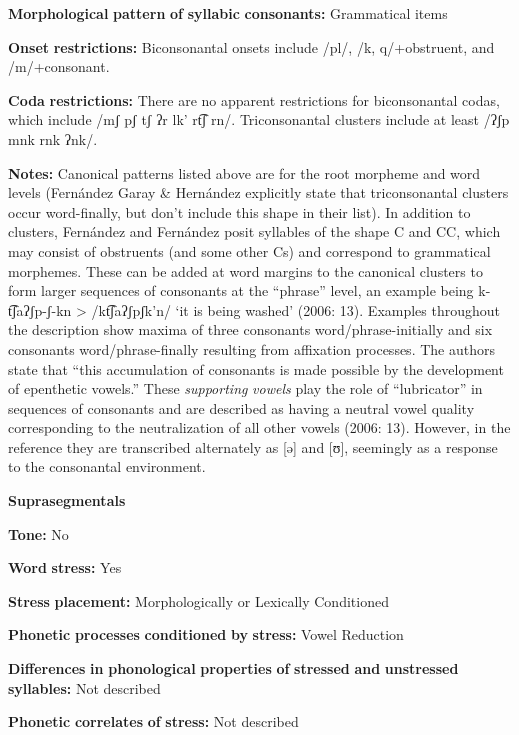 \textbf{Morphological} \textbf{pattern} \textbf{of} \textbf{syllabic} \textbf{consonants:} Grammatical items

\textbf{Onset} \textbf{restrictions:} Biconsonantal onsets include /pl/, /k, q/+obstruent, and /m/+consonant.

\textbf{Coda} \textbf{restrictions:} There are no apparent restrictions for biconsonantal codas, which include /mʃ pʃ tʃ ʔr lk' rt͡ʃ rn/. Triconsonantal clusters include at least /ʔʃp mnk rnk ʔnk/.

\textbf{Notes:} Canonical patterns listed above are for the root morpheme and word levels (Fernández Garay \& Hernández explicitly state that triconsonantal clusters occur word-finally, but don’t include this shape in their list). In addition to clusters, Fernández \citet{Garay1998} and Fernández \citet{GarayHernández2006} posit syllables of the shape C and CC, which may consist of obstruents (and some other Cs) and correspond to grammatical morphemes. These can be added at word margins to the canonical clusters to form larger sequences of consonants at the “phrase” level, an example being k{}-t͡ʃaʔʃp{}-ʃ{}-kn > /kt͡ʃaʔʃpʃk’n/ ‘it is being washed’ (2006: 13). Examples throughout the description show maxima of three consonants word/phrase-initially and six consonants word/phrase-finally resulting from affixation processes. The authors state that “this accumulation of consonants is made possible by the development of epenthetic vowels.” These \textit{supporting} \textit{vowels} play the role of “lubricator” in sequences of consonants and are described as having a neutral vowel quality corresponding to the neutralization of all other vowels (2006: 13). However, in the  reference they are transcribed alternately as [ə] and [ʊ], seemingly as a response to the consonantal environment.

\textbf{Suprasegmentals}

\textbf{Tone:} No

\textbf{Word} \textbf{stress:} Yes

\textbf{Stress} \textbf{placement:} Morphologically or Lexically Conditioned

\textbf{Phonetic} \textbf{processes} \textbf{conditioned} \textbf{by} \textbf{stress:} Vowel Reduction

\textbf{Differences} \textbf{in} \textbf{phonological} \textbf{properties} \textbf{of} \textbf{stressed} \textbf{and} \textbf{unstressed} \textbf{syllables:} Not described

\textbf{Phonetic} \textbf{correlates} \textbf{of} \textbf{stress:} Not described

